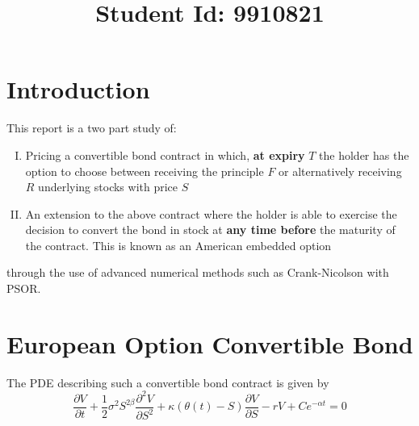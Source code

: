 \documentclass{article}
\begin{document}
\title{Student Id: 9910821}
\date{}

\maketitle
\section*{Introduction}
This report is a two part study of:
\begin{enumerate}[I)]
  \item Pricing a convertible bond contract in  which, \textbf{at expiry} $T$ the  holder  has  the option to  choose  between  receiving the principle $F$ or alternatively receiving $R$ underlying stocks with price $S$
  \item An extension to the above contract where the holder is able to exercise the decision to convert the bond in stock at \textbf{any time before} the maturity of the contract. This is known as an American embedded option
\end{enumerate}
through the use of advanced numerical methods such as Crank-Nicolson with PSOR.

\section{European Option Convertible Bond}
The PDE describing such a convertible bond contract is given by
\begin{equation}
  \frac{\partial V}{\partial t} + \frac{1}{2}\sigma^{2}S^{2\beta}\frac{\partial^2 V}{\partial S^2}+\kappa(\theta (t) -S)\frac{\partial V}{\partial S} -rV + Ce^{-\alpha t} =0
  \label{eq:pde_convertible}
\end{equation}
\end{document}

